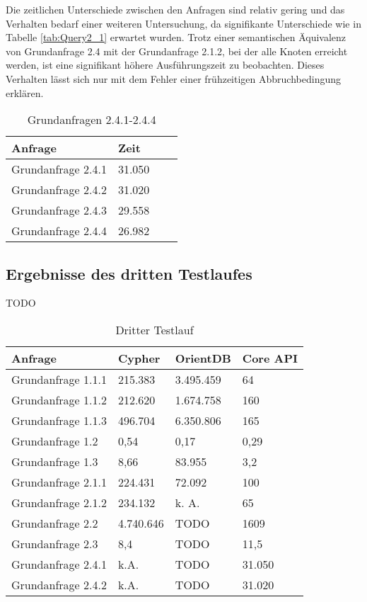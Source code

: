 Die zeitlichen Unterschiede zwischen den Anfragen sind relativ gering und das Verhalten bedarf einer weiteren Untersuchung, da signifikante Unterschiede wie in Tabelle \ref{tab:Query2_1} erwartet wurden.\newline
Trotz einer semantischen Äquivalenz von Grundanfrage 2.4 mit der Grundanfrage 2.1.2, bei der alle Knoten erreicht werden, ist eine signifikant höhere Ausführungszeit zu beobachten. Dieses Verhalten lässt sich nur mit dem Fehler einer frühzeitigen Abbruchbedingung erklären.    
\FloatBarrier
\begin{table}[!htb]
	\centering
	\begin{tabular}{ |p{5cm}||p{3cm}|p{3cm}|p{3cm}|  }
		\hline
		Anfrage & Zeit\\
		\hline
		Grundanfrage 2.4.1 & 31.050\\
		\hline
		 Grundanfrage 2.4.2 & 31.020  \\
		\hline
		Grundanfrage 2.4.3 &  29.558  \\
		\hline
		Grundanfrage 2.4.4 &  26.982\\
		\hline
	\end{tabular}
	\caption{Grundanfragen 2.4.1-2.4.4}
	\label{tab:Query2_4}
\end{table}
\FloatBarrier

\subsection{Ergebnisse des dritten Testlaufes}
TODO
\FloatBarrier
\begin{table}[h]
	\centering
	\begin{tabular}{ |p{6cm}||p{2cm}|p{2cm}|p{2cm}|  }
		\hline
		Anfrage& Cypher & OrientDB & Core API \\
		\hline
	Grundanfrage 1.1.1  & 215.383 & 3.495.459    &  64\\
	Grundanfrage 1.1.2& 212.620 & 1.674.758   & 160   \\
	Grundanfrage 1.1.3& 496.704 & 6.350.806 & 165  \\
	Grundanfrage 1.2& 0,54 & 0,17   & 0,29   \\
	Grundanfrage 1.3 & 8,66& 83.955  & 3,2    \\
	Grundanfrage 2.1.1& 224.431 & 72.092   & 100   \\
	Grundanfrage 2.1.2& 234.132& k. A.  & 65    \\
	Grundanfrage 2.2& 4.740.646 & TODO    & 1609  \\
	Grundanfrage 2.3& 8,4  & TODO   & 11,5   \\
	Grundanfrage 2.4.1& k.A. & TODO    & 31.050  \\
	Grundanfrage 2.4.2& k.A.  & TODO   & 31.020   \\
		\hline
	\end{tabular}
	\caption{Dritter Testlauf}
\end{table}
\FloatBarrier
